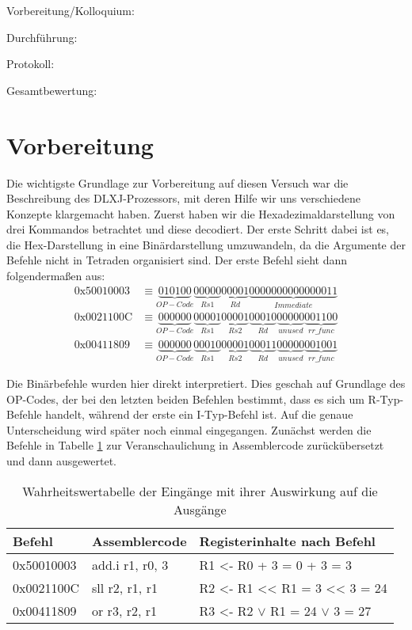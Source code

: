 \documentclass[12pt,a4paper]{scrartcl}
\begin{document}
Vorbereitung/Kolloquium:

Durchf\"uhrung:

Protokoll:

Gesamtbewertung:
\clearpage



\section{Vorbereitung}
Die wichtigste Grundlage zur Vorbereitung auf diesen Versuch war die Beschreibung des DLXJ-Prozessors, mit deren Hilfe wir uns verschiedene Konzepte klargemacht haben.
Zuerst haben wir die Hexadezimaldarstellung von drei Kommandos betrachtet und diese decodiert.
Der erste Schritt dabei ist es, die Hex-Darstellung in eine Bin\"ardarstellung umzuwandeln, da die Argumente der Befehle nicht in Tetraden organisiert sind.
Der erste Befehl sieht dann folgenderma\ss en aus:
\begin{align*}
\text{0x50010003} & \equiv \underbrace{010100}_{OP-Code}\underbrace{00000}_{Rs1}\underbrace{00001}_{Rd}\underbrace{0000000000000011}_{Immediate} \\
\text{0x0021100C} & \equiv \underbrace{000000}_{OP-Code}\underbrace{00001}_{Rs1}\underbrace{00001}_{Rs2}\underbrace{00010}_{Rd}\underbrace{00000}_{unused}\underbrace{001100}_{rr\_func} \\
\text{0x00411809} & \equiv \underbrace{000000}_{OP-Code}\underbrace{00010}_{Rs1}\underbrace{00001}_{Rs2}\underbrace{00011}_{Rd}\underbrace{00000}_{unused}\underbrace{001001}_{rr\_func}
\end{align*}

Die Bin\"arbefehle wurden hier direkt interpretiert.
Dies geschah auf Grundlage des OP-Codes, der bei den letzten beiden Befehlen bestimmt, dass es sich um R-Typ-Befehle handelt, w\"ahrend der erste ein I-Typ-Befehl ist.
Auf die genaue Unterscheidung wird sp\"ater noch einmal eingegangen.
Zun\"achst werden die Befehle in Tabelle \ref{tab:vorbinstr} zur Veranschaulichung in Assemblercode zur\"uck\"ubersetzt und dann ausgewertet.

\begin{table}[h]
    \centering
    \begin{tabular}{l|l|l}
    \hline
    Befehl      & Assemblercode     & Registerinhalte nach Befehl           \\
    \hline
    0x50010003  & add.i r1, r0, 3   & R1 <- R0 + 3 = 0 + 3 = 3              \\
    0x0021100C  & sll   r2, r1, r1  & R2 <- R1 << R1 = 3 << 3 = 24          \\
    0x00411809  & or    r3, r2, r1  & R3 <- R2 $\vee$ R1 = 24 $\vee$ 3 = 27 \\
    \hline
    \end{tabular}
    \caption{Wahrheitswertabelle der Eing\"ange mit ihrer Auswirkung auf die Ausg\"ange}
    \label{tab:vorbinstr}
\end{table}
\end{document}
